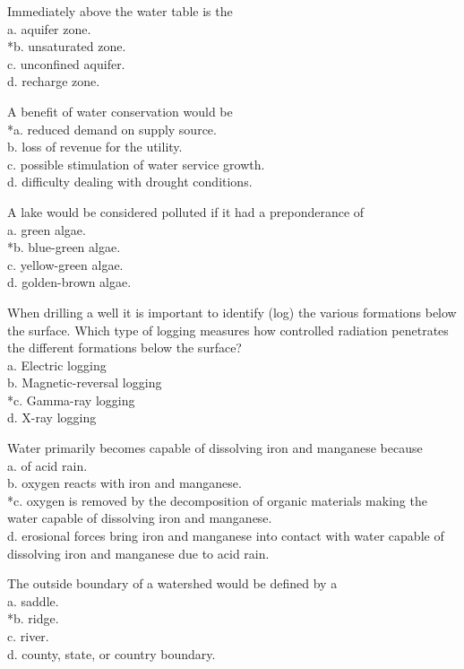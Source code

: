   \item Immediately above the water table is the\\
a. aquifer zone.\\
*b. unsaturated zone.\\
c. unconfined aquifer.\\
d. recharge zone. 

  \item A benefit of water conservation would be\\
*a. reduced demand on supply source.\\
b. loss of revenue for the utility.\\
c. possible stimulation of water service growth.\\
d. difficulty dealing with drought conditions.\\

  \item A lake would be considered polluted if it had a preponderance of\\
a. green algae.\\
*b. blue-green algae.\\
c. yellow-green algae.\\
d. golden-brown algae.\\


 \item When drilling a well it is important to identify (log) the various formations below the surface. Which type of logging measures how controlled radiation penetrates the different formations below the surface?\\
a. Electric logging\\
b. Magnetic-reversal logging\\
*c. Gamma-ray logging\\
d. X-ray logging\\

  \item Water primarily becomes capable of dissolving iron and manganese because\\
a. of acid rain.\\
b. oxygen reacts with iron and manganese.\\
*c. oxygen is removed by the decomposition of organic materials making the water capable of dissolving iron and manganese.\\
d. erosional forces bring iron and manganese into contact with water capable of dissolving iron and manganese due to acid rain.\\
  \item The outside boundary of a watershed would be defined by a\\
a. saddle.\\
*b. ridge.\\
c. river.\\
d. county, state, or country boundary.\\

